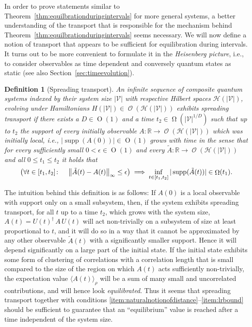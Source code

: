 \documentclass[a4paper,12pt,listof=totoc,index=totoc,bibliography=totoc,headsepline=false,headings=normal,BCOR16.153846mm,DIV12,headinclude,twoside,cleardoublepage=empty,numbers=noenddot,final]{scrreprt}
\theoremstyle{mystyle}
\numberwithin{equation}{section}
\numberwithin{figure}{section}
\numberwithin{lemma}{section}
\numberwithin{theorem}{section}
\numberwithin{corollary}{section}
\newtheorem{definition}{Definition}
\numberwithin{definition}{section}
\numberwithin{conjecture}{section}
\numberwithin{observation}{section}
\newcommand{\+}{\mkern2mu}
\newcommand{\oftype}{\colon}
\newcommand{\itholds}{\colon\mathchoice{\quad}{}{}{}}
\renewcommand{\H}{H}
\newcommand{\Vset}{\mathcal{V}}
\newcommand{\ex}[2]{\langle #1 \rangle_{#2}}
\newcommand{\norm}[2][]{
  \ifthenelse{\equal{#1}{}}
    {\left\| {#2} \right\|}
    {\ifthenelse{\equal{#1}{uinv}}
      {\left\vert\kern-0.25ex\left\vert\kern-0.25ex\left\vert {#2} \right\vert\kern-0.25ex\right\vert\kern-0.25ex\right\vert}
      {\left\| {#2} \right\|_{#1}}
    }
}
\DeclareMathOperator{\landauO}{O}
\DeclareMathOperator{\landauOmega}{\Omega}
\newcommand{\ad}{^\dagger}
\DeclareMathOperator{\1}{\mathds{1}}
\DeclareMathOperator{\Obs}{\mathcal{O}}
\DeclareMathOperator{\supp}{supp}
\newcommand{\mc}[1]{\mathcal{#1}}
\newcommand{\mcH}{\mc{H}}
\newcommand{\mb}[1]{\mathbb{#1}}
\newcommand{\R}{\mb{R}}
\begin{document}
In order to prove statements similar to Theorem~\ref{thm:equilbrationduringintervals} for more general systems, a better understanding of the transport that is responsible for the mechanism behind Theorem~\ref{thm:equilbrationduringintervals} seems necessary.
We will now define a notion of transport that appears to be sufficient for equilibration during intervals.
It turns out to be more convenient to formulate it in the \emph{Heisenberg picture}, i.e., to consider observables as time dependent and conversely quantum states as static (see also Section~\ref{sec:timeevolution}). 
\begin{definition}[Spreading transport] \label{def:mixingtransport}
  An infinite sequence of composite quantum systems indexed by their system size $|\Vset|$ with respective Hilbert spaces $\mcH(|\Vset|)$, evolving under Hamiltonians $\H(|\Vset|) \in \Obs(\mcH(|\Vset|))$ exhibits \emph{spreading transport} if there exists a $D \in \landauO(1)$ and a time $t_2 \in \landauOmega(|\Vset|^{1/D})$ such that up to $t_2$ the support of every initially observable $A\oftype \R \to  \Obs(\mcH(|\Vset|))$ which was initially local, i.e., $|\supp(A(0))| \in \landauO(1)$ grows with time in the sense that for every sufficiently small $0<\epsilon \in \landauO(1)$ and every $\tilde{A}\oftype \R \to \Obs(\mcH(|\Vset|))$ and all $0 \leq t_1 \leq t_2$ it holds that 
  \begin{equation}
    \left( \forall t \in [t_1,t_2]\itholds \norm[\infty]{\tilde{A}(t) - A(t)} \leq \epsilon \right) \implies \inf_{t \in [t_1,t_2]} |\supp(\tilde{A}(t))| \in \landauOmega(t_1) .
  \end{equation}
\end{definition}

The intuition behind this definition is as follows:
If $A(0)$ is a local observable with support only on a small subsystem, then, if the system exhibits spreading transport, for all $t$ up to a time $t_2$, which grows with the system size, $A(t) = U(t)\ad\,A\,U(t)$ will act non-trivially on a subsystem of size at least proportional to $t$, and it will do so in a way that it cannot be approximated by any other observable $\tilde{A}(t)$ with a significantly smaller support.
Hence it will depend significantly on a large part of the initial state.
If the initial state exhibits some form of clustering of correlations with a correlation length that is small compared to the size of the region on which $A(t)$ acts sufficiently non-trivially, the expectation value $\ex{A(t)}{\rho}$ will be a sum of many small and uncorrelated contributions, and will hence look \emph{equilibrated}.
Thus it seems that spreading transport together with conditions \ref{item:naturalnotionofdistance}--\ref{item:lrbound} should be sufficient to guarantee that an ``equilibrium'' value is reached after a time independent of the system size.
\end{document}
